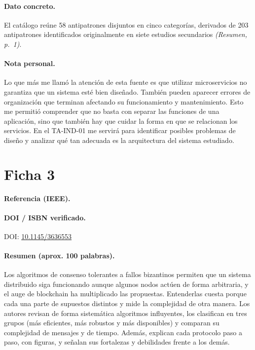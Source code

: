 \documentclass[12pt,a4paper]{article}
\begin{document}
\paragraph{Dato concreto.}
El catálogo reúne 58 antipatrones disjuntos en cinco categorías, derivados de 203 antipatrones identificados originalmente en siete estudios secundarios \textit{(Resumen, p.~1)}.

\paragraph{Nota personal.}
Lo que más me llamó la atención de esta fuente es que utilizar microservicios no garantiza que un sistema esté bien diseñado. También pueden aparecer errores de organización que terminan afectando su funcionamiento y mantenimiento. Esto me permitió comprender que no basta con separar las funciones de una aplicación, sino que también hay que cuidar la forma en que se relacionan los servicios. En el TA-IND-01 me servirá para identificar posibles problemas de diseño y analizar qué tan adecuada es la arquitectura del sistema estudiado.

\clearpage

\section{Ficha 3}

\paragraph{Referencia (IEEE).}

\paragraph{DOI / ISBN verificado.}
DOI: \href{https://doi.org/10.1145/3636553}{10.1145/3636553}

\paragraph{Resumen (aprox. 100 palabras).}
Los algoritmos de consenso tolerantes a fallos bizantinos permiten que un sistema distribuido siga funcionando aunque algunos nodos actúen de forma arbitraria, y el auge de blockchain ha multiplicado las propuestas. Entenderlas cuesta porque cada una parte de supuestos distintos y mide la complejidad de otra manera. Los autores revisan de forma sistemática algoritmos influyentes, los clasifican en tres grupos (más eficientes, más robustos y más disponibles) y comparan su complejidad de mensajes y de tiempo. Además, explican cada protocolo paso a paso, con figuras, y señalan sus fortalezas y debilidades frente a los demás.
\end{document}
